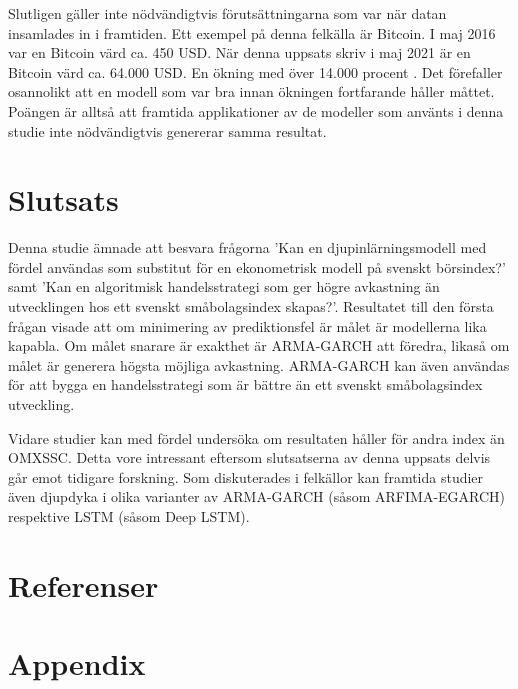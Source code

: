 \documentclass[11pt]{article}
\numberwithin{equation}{section}
\numberwithin{table}{section}
\numberwithin{figure}{section}
\begin{document}
Slutligen gäller inte nödvändigtvis förutsättningarna som var när datan insamlades in i framtiden. Ett exempel på denna felkälla är Bitcoin. I maj 2016 var en Bitcoin värd ca. 450 USD. När denna uppsats skriv i maj 2021 är en Bitcoin värd ca. 64.000 USD. En ökning med över 14.000 procent \parencite{yahoo_bitcoin}. Det förefaller osannolikt att en modell som var bra innan ökningen fortfarande håller måttet. Poängen är alltså att framtida applikationer av de modeller som använts i denna studie inte nödvändigtvis genererar samma resultat.

\newpage
\section{Slutsats}
Denna studie ämnade att besvara frågorna 'Kan en djupinlärningsmodell med fördel användas som substitut för en ekonometrisk modell på svenskt börsindex?' samt 'Kan en algoritmisk handelsstrategi som ger högre avkastning än utvecklingen hos ett svenskt småbolagsindex skapas?'. Resultatet till den första frågan visade att om minimering av prediktionsfel är målet är modellerna lika kapabla. Om målet snarare är exakthet är ARMA-GARCH att föredra, likaså om målet är generera högsta möjliga avkastning. ARMA-GARCH kan även användas för att bygga en handelsstrategi som är bättre än ett svenskt småbolagsindex utveckling.

Vidare studier kan med fördel undersöka om resultaten håller för andra index än OMXSSC. Detta vore intressant eftersom slutsatserna av denna uppsats delvis går emot tidigare forskning. Som diskuterades i felkällor kan framtida studier även djupdyka i olika varianter av ARMA-GARCH (såsom ARFIMA-EGARCH) respektive LSTM (såsom Deep LSTM).



\newpage
\section*{Referenser}
\printbibliography[heading=none]




\newpage

\appendix
\section*{Appendix}
\renewcommand{\thesubsection}{\Alph{subsection}}
\end{document}
